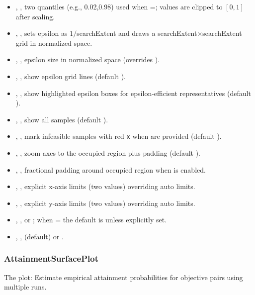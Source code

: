 \begin{itemize}
  \item {}, , two quantiles (e.g., 0.02,0.98) used when =; values are clipped to \([0,1]\) after scaling.
  \item {}, , sets epsilon as \(1/\)searchExtent and draws a searchExtent\(\times\)searchExtent grid in normalized space.
  \item {}, , epsilon size in normalized space (overrides ).
  \item {}, , show epsilon grid lines (default ).
  \item {}, , show highlighted epsilon boxes for epsilon-efficient representatives (default ).
  \item {}, , show all samples (default ).
  \item {}, , mark infeasible samples with red \texttt{x} when  are provided (default ).
  \item {}, , zoom axes to the occupied region plus padding (default ).
  \item {}, , fractional padding around occupied region when  is enabled.
  \item {}, , explicit x-axis limits (two values) overriding auto limits.
  \item {}, , explicit y-axis limits (two values) overriding auto limits.
  \item {}, ,  or ; when = the default is  unless explicitly set.
  \item {}, ,  (default) or .
\end{itemize}

\subsubsection{AttainmentSurfacePlot}
The   plot: Estimate empirical attainment probabilities for objective pairs using multiple runs.

